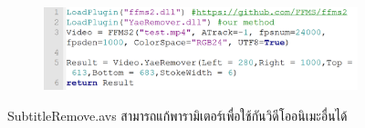 \begin{figure}[H]
    \centering
    \begin{subfigure}{0.8\linewidth}
        \centering
        \includegraphics[width=1\linewidth]{image/demo_anime/notepad.png}
    \end{subfigure}
    \caption{SubtitleRemove.avs สามารถแก้พารามิเตอร์เพื่อใช้กันวิดีโออนิเมะอื่นได้}
\end{figure}